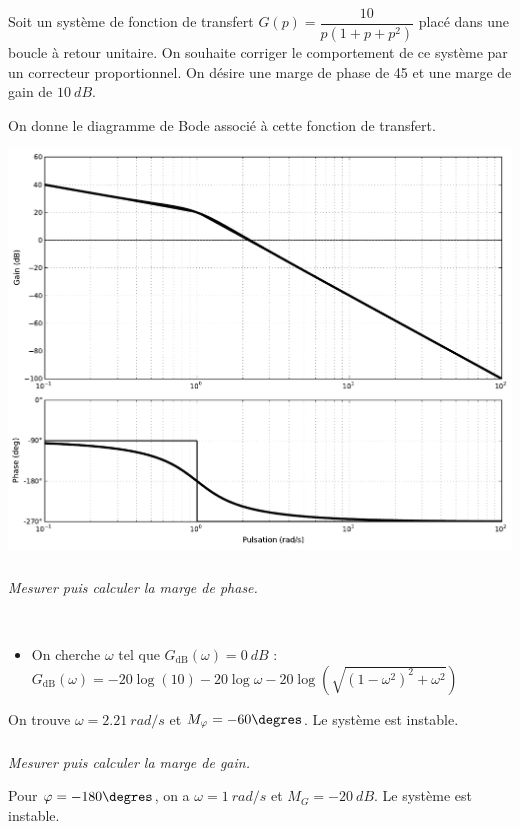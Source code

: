 \documentclass[10pt,fleqn]{article} %
\begin{document}
\begin{multicols}{2}
\setcounter{exo}{0}
Soit un système de fonction de transfert $G(p)=\dfrac{10}{p\left(1+p+p^2\right)}$ placé dans une boucle à retour unitaire. On souhaite corriger le comportement de ce système par un correcteur proportionnel. On désire une marge de phase de \SI{45}{\degres} et une marge de gain de $\SI{10}{dB}$.

On donne le diagramme de Bode associé à cette fonction de transfert. 
\begin{center}
\includegraphics[width=\linewidth]{images/exo_01_bode}
\end{center}


\subparagraph{}\textit{Mesurer puis calculer la marge de phase.}
\ifprof
\begin{corrige}~\\
\begin{itemize}
\item On cherche $\omega$ tel que $G_{\text{dB}}(\omega)=\SI{0}{dB}$  :
$G_{\text{dB}}(\omega)=-20\log(10) -20\log\omega-20\log\left(\sqrt{(1-\omega^2)^2+\omega^2}\right)$
\end{itemize}

On trouve $\omega=\SI{2,21}{rad/s}$ et $M_{\varphi}=-60\degres$. Le système est instable.
\end{corrige}
\else
\fi

\subparagraph{}\textit{Mesurer puis calculer la marge de gain.}
\ifprof
\begin{corrige}
Pour $\varphi=-180\degres$, on a $\omega=\SI{1}{rad/s}$ et $M_{G}=\SI{-20}{dB}$. Le système est instable.
\end{corrige}
\else
\fi


\end{multicols}
\end{document}
